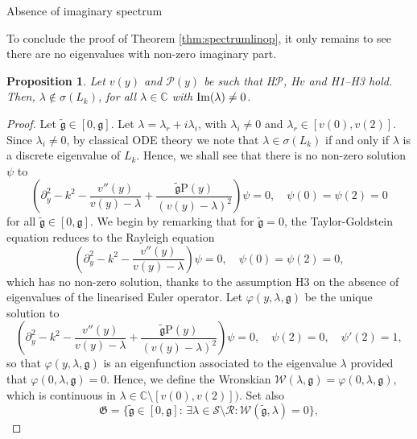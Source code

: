 \documentclass[11pt,reqno]{amsproc}
\makeatletter
\renewcommand\subsection{\@startsection{subsection}{2}%
\normalparindent{.5\linespacing\@plus.7\linespacing}{-.5em}
{\normalfont\bfseries}}
\newtheorem{proposition}{Proposition}[section]
\theoremstyle{definition}
\numberwithin{equation}{section}
\newcommand{\C}{{\mathbb C}}
\newcommand{\W}{{\mathcal{W}}}
\newcommand{\g}{{\mathfrak{g}}}
\renewcommand{\P}{{\mathcal{P}}}
\newcommand{\p}{\partial}
\def\Im{{\rm Im}}
\makeatother
\begin{document}
\subsection{Absence of imaginary spectrum}

To conclude the proof of Theorem \ref{thm:spectrumlinop}, it only remains to see there are no eigenvalues with non-zero imaginary part.
\begin{proposition}\label{prop:noimagspectrum}
Let $v(y)$ and $\P(y)$ be such that {H$\P$, H$v$} and H1--H3 hold. Then, $\lambda\not \in \sigma(L_k)$, for all $\lambda\in \C$ with $\Im(\lambda)\neq 0$.
\end{proposition}

\begin{proof}
Let $\tilde{\g} \in [0,\g]$. Let $\lambda=\lambda_r +i\lambda_i$, with $\lambda_i\neq 0$ and $\lambda_r\in [v(0),v(2)]$. {Since $\lambda_i\neq 0$, by classical ODE theory we note that $\lambda\in \sigma (L_k)$ if and only if $\lambda$ is a discrete eigenvalue of $L_k$}. Hence, we shall see that there is no non-zero solution $\psi$ to 
\begin{equation}
\left( \p_y^2 - k^2 -\frac{v''(y)}{v(y) - \lambda}+ \frac{\tilde{\g}\mathrm{P}(y)}{(v(y)-\lambda)^2} \right)\psi = 0, \quad \psi(0)=\psi(2)=0
\end{equation}
for all $\tilde{\g}\in [0, \g]$. We begin by remarking that for $\tilde{\g}=0$, the Taylor-Goldstein equation reduces to the Rayleigh equation
\begin{equation}
\left( \p_y^2 - k^2 -\frac{v''(y)}{v(y) - \lambda} \right)\psi = 0, \quad \psi(0)=\psi(2)=0,
\end{equation}
which has no non-zero solution, thanks to the assumption H3 on the absence of eigenvalues of the linearised Euler operator. Let $\varphi(y,\lambda,\g)$ be the unique solution to 
\begin{equation}\label{eq:TGlambdaeigenvalue}
\left( \p_y^2 - k^2 -\frac{v''(y)}{v(y) - \lambda}+\frac{ \tilde{\g}\mathrm{P}(y)}{(v(y)-\lambda)^2} \right)\psi = 0, \quad \psi(2)=0,\quad \psi'(2)=1,
\end{equation}
so that $\varphi(y,\lambda,\g)$ is an eigenfunction associated to the eigenvalue $\lambda$ provided that $\varphi(0,\lambda,\g)=0$. Hence, we define the Wronskian $\W(\lambda,\g) = \varphi(0,\lambda,\g)$, which is continuous in $\lambda\in \C\setminus [v(0),v(2)])$. Set also
\begin{equation}
\mathfrak{G} = \lbrace \tilde{\g}\in [0, \g ]: \, \exists \lambda \in \mathcal{S}\setminus \mathcal{R}: \mathcal{W}(\tilde{\g},\lambda) = 0 \rbrace ,

\end{equation}
\end{proof}
\end{document}
